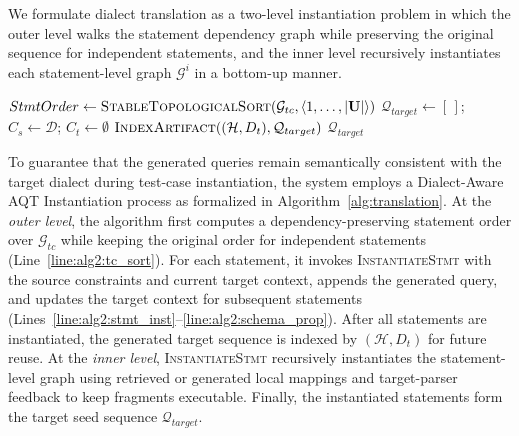 \documentclass[conference]{IEEEtran}
\begin{document}
We formulate dialect translation as a two-level instantiation problem in which the outer level walks the statement dependency graph while preserving the original sequence for independent statements, and the inner level recursively instantiates each statement-level graph $\mathcal{G}^i$ in a bottom-up manner.
\begin{algorithm}[htbp]
\small
\caption{AQT Instantiation}
\label{alg:translation}
$StmtOrder \leftarrow \textsc{StableTopologicalSort}(\mathcal{G}_{tc}, \langle 1,\ldots,|\mathbf{U}| \rangle)$ \label{line:alg2:tc_sort} 
$\mathcal{Q}_{target} \leftarrow [\,]$; $C_s \leftarrow \mathcal{D}$; $C_t \leftarrow \emptyset$\;
$\textsc{IndexArtifact}((\mathcal{H}, D_t), \mathcal{Q}_{target})$ 
\Return $\mathcal{Q}_{target}$\;
\end{algorithm}
To guarantee that the generated queries remain semantically consistent with the target dialect during test-case instantiation, the system employs a Dialect-Aware AQT Instantiation process as formalized in Algorithm~\ref{alg:translation}.
At the \emph{outer level}, the algorithm first computes a dependency-preserving statement order over $\mathcal{G}_{tc}$ while keeping the original order for independent statements (Line~\ref{line:alg2:tc_sort}).
For each statement, it invokes \textsc{InstantiateStmt} with the source constraints and current target context, appends the generated query, and updates the target context for subsequent statements (Lines~\ref{line:alg2:stmt_inst}--\ref{line:alg2:schema_prop}).
After all statements are instantiated, the generated target sequence is indexed by $(\mathcal{H},D_t)$ for future reuse.
At the \emph{inner level}, \textsc{InstantiateStmt} recursively instantiates the statement-level graph using retrieved or generated local mappings and target-parser feedback to keep fragments executable.
Finally, the instantiated statements form the target seed sequence $\mathcal{Q}_{target}$.
\end{document}
